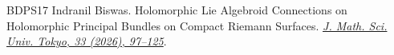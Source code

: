 \documentclass[12pt,reqno]{amsart}
\numberwithin{equation}{subsection}
\theoremstyle{definition}
\theoremstyle{theorem}
\begin{document}
\begin{thebibliography}{BDPS17}
	\newblock Indranil Biswas.
	\newblock Holomorphic Lie Algebroid Connections on
	Holomorphic Principal Bundles on Compact Riemann Surfaces.
	\newblock \href{https://www.ms.u-tokyo.ac.jp/journal/33-1-4.pdf}{\em J. Math. Sci. Univ. Tokyo, 33 (2026), 97–125}.
	
	
	
	
	
		
	
	
	

\end{thebibliography}
\end{document}

